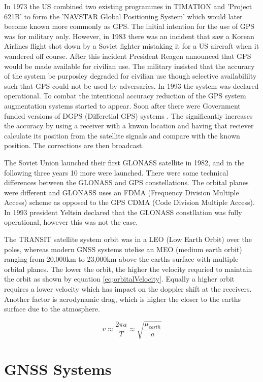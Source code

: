 In 1973 the US combined two existing programmes in TIMATION and 'Project 621B' to form the 'NAVSTAR Global Positioning System' which would later become known more
commonly as GPS. The initial intention for the use of GPS was for military only. However, in 1983 there was an incident that saw a Korean Airlines flight shot down by a
Soviet fighter mistaking it for a US aircraft when it wandered off course. After this incident President Reagen announced that GPS would be made available for civilian
use. The military insisted that the accuracy of the system be purposley degraded for civilian use though selective availabililty such that GPS could not be used by
adversaries. In 1993 the system was declared operational. To combat the intentional accuracy reduction of the GPS system augmentation systems started to appear. Soon
after there were Government funded versions of DGPS (Differetial GPS) systems \cite{RN43}. The significantly increases the accuracy by using a receiver with a knwon
location and having that reciever calculate its position from the satellite signals and compare with the known position. The corrections are then broadcast. 

The Soviet Union launched their first GLONASS satellite in 1982, and in the following three years 10 more were launched. There were some technical differences between the
GLONASS and GPS constellations. The orbital planes were different and GLONASS uses an FDMA (Frequency Division Multiple Access) scheme as opposed to the GPS CDMA (Code
Division Multiple Access). In 1993 president Yeltsin declared that the GLONASS constllation was fully operational, however this was not the case. 

The TRANSIT satellite system orbit was in a LEO (Low Earth Orbit) over the poles, whereas modern GNSS systems utelise an MEO (medium earth orbit) ranging from 20,000km to
23,000km above the earths surface with multiple orbital planes.
The lower the orbit, the higher the velocity requried to maintain the orbit as shown by equation \ref{eq:orbitalVelocity}. Equally a higher orbit requires a lower velocity which
has impact on the doppler shift at the receivers. Another factor is aerodynamic drag, which is higher the closer to the earths surface due to the atmosphere.

\begin{equation} \label{eq:orbitalVelocity}
    v \approx \frac{2\pi a}{T} \approx \sqrt{\frac{\mu_{earth}}{a}}
\end{equation} 

\section{GNSS Systems}
